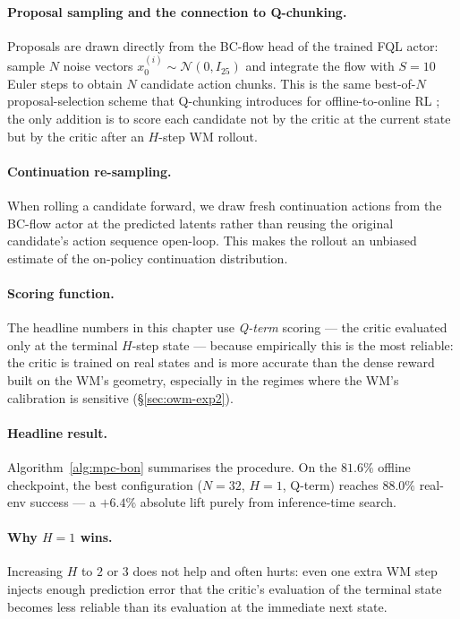 \paragraph{Proposal sampling and the connection to Q-chunking.}
Proposals are drawn directly from the BC-flow head of the trained FQL
actor: sample $N$ noise vectors $x_0^{(i)} \sim \mathcal{N}(0, I_{25})$
and integrate the flow with $S = 10$ Euler steps to obtain $N$
candidate action chunks. This is the same best-of-$N$ proposal-selection
scheme that Q-chunking introduces for offline-to-online RL
\cite{li2025reinforcement}; the only addition is to score each
candidate not by the critic at the current state but by the critic
after an $H$-step WM rollout.

\paragraph{Continuation re-sampling.}
When rolling a candidate forward, we draw fresh continuation actions
from the BC-flow actor at the predicted latents rather than reusing the
original candidate's action sequence open-loop. This makes the rollout
an unbiased estimate of the on-policy continuation distribution.

\paragraph{Scoring function.}
The headline numbers in this chapter use \emph{Q-term} scoring --- the
critic evaluated only at the terminal $H$-step state --- because
empirically this is the most reliable: the critic is trained on real
states and is more accurate than the dense reward built on the WM's
geometry, especially in the regimes where the WM's calibration is
sensitive (§\ref{sec:owm-exp2}).

\paragraph{Headline result.}
Algorithm~\ref{alg:mpc-bon} summarises the procedure. On the $81.6\%$
offline checkpoint, the best configuration ($N = 32$, $H = 1$, Q-term)
reaches $88.0\%$ real-env success --- a $+6.4\%$ absolute lift purely
from inference-time search.

\paragraph{Why $H = 1$ wins.}
Increasing $H$ to $2$ or $3$ does not help and often hurts: even one
extra WM step injects enough prediction error that the critic's
evaluation of the terminal state becomes less reliable than its
evaluation at the immediate next state.

